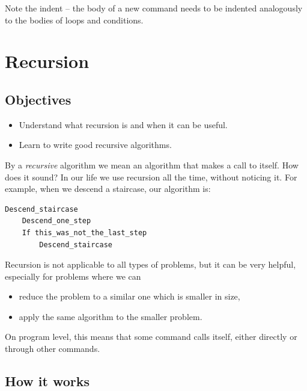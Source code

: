 \noindent
Note the indent -- the body of a new command needs to be indented 
analogously to the bodies of loops and conditions.


\section{Recursion} \label{sec:recursion}

\subsection{Objectives} 
 
\begin{itemize}
\item Understand what recursion is and when it can be useful.
\item Learn to write good recursive algorithms.
\end{itemize}
By a {\em recursive} algorithm we mean an algorithm that makes a call to itself. How does it sound?
In our life we use recursion all the time, without noticing it. For example, when we descend 
a staircase, our algorithm is:\\

\begin{bbox}
\begin{Verbatim}[commandchars=\\\{\}]
Descend_staircase
    Descend_one_step
    If this_was_not_the_last_step
        Descend_staircase
\end{Verbatim}
\end{bbox}
\vspace{6mm}

\noindent
Recursion is not applicable to all types of problems, but it can be very 
helpful, especially for problems where we can
\begin{itemize}
\item reduce the problem to a similar one which is smaller in size, 
\item apply the same algorithm to the smaller problem. 
\end{itemize}
On program level, this means that some command calls itself, either 
directly or through other commands.

\subsection[\ \ How it works]{How it works} 

